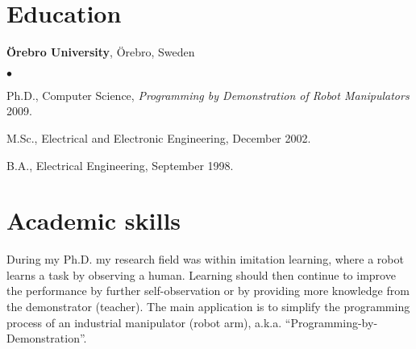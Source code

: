 \documentclass[a4paper,margin,line]{res} \usepackage{latexsym}
\newenvironment{list2}{
  \begin{list}{$\bullet$}{%
      \setlength{\itemsep}{0in} \setlength{\parsep}{0in}
      \setlength{\parskip}{0in} \setlength{\topsep}{0in}
      \setlength{\partopsep}{0in}
      \setlength{\leftmargin}{0.2in}}}{\end{list}}
\begin{document}
\begin{resume}
\section{\sc Education}
{\bf Örebro University}, Örebro, Sweden\\

\vspace*{-.1in}
\begin{list2}
\item Ph.D., Computer Science, {\it Programming by Demonstration of
  Robot Manipulators} 2009.
\vspace*{.03in}
\item M.Sc., Electrical and Electronic Engineering, December 2002.
\vspace*{.03in}
\item B.A., Electrical Engineering, September 1998.
\end{list2}

\section{\sc Academic skills}
During my Ph.D. my research field was within imitation learning, where
a robot learns a task by observing a human.  Learning should then
continue to improve the performance by further self-observation or by
providing more knowledge from the demonstrator (teacher). The main
application is to simplify the programming process of an industrial
manipulator (robot arm), a.k.a. ``Programming-by-Demonstration''.





\end{resume}
\end{document}
